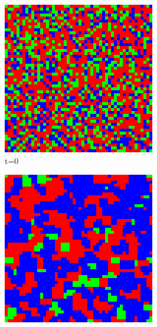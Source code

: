 \documentclass[a4paper, 11pt]{article}
\begin{document}
\begin{landscape}
\begin{figure}[H]
\centering
\begin{subfigure}{.20\textwidth}
  \centering
  \includegraphics[width=0.95\linewidth]{ROCK_PAPER_SCISSORS_MOORE_50x50_HighRockPop50_t00}
  \caption{t=0}
\end{subfigure}%
\begin{subfigure}{.20\textwidth}
  \centering
  \includegraphics[width=0.95\linewidth]{ROCK_PAPER_SCISSORS_MOORE_50x50_HighRockPop50_t01}

\end{subfigure}
\end{figure}
\end{landscape}
\end{document}
